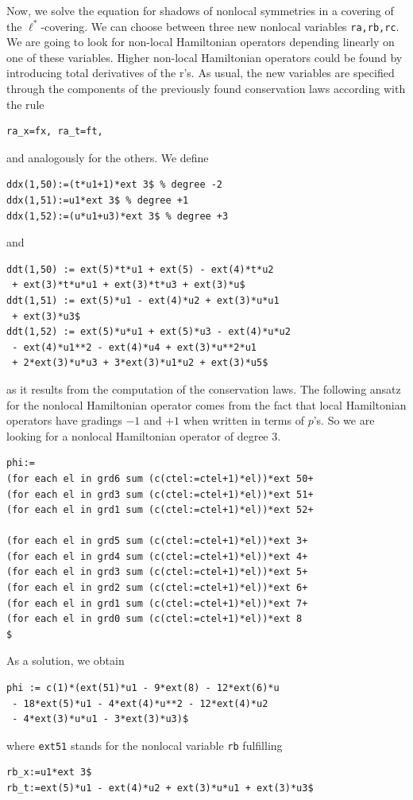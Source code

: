 Now, we solve the equation for shadows of nonlocal symmetries in a covering of
the $\ell^*$-covering. We can choose between three new nonlocal variables
\texttt{ra,rb,rc}. We are going to look for non-local Hamiltonian operators
depending linearly on one of these variables. Higher non-local Hamiltonian
operators could be found by introducing total derivatives of the r's.
As usual, the new variables are specified through the components of the
previously found conservation laws according with the rule
\begin{verbatim}
ra_x=fx, ra_t=ft,
\end{verbatim}
and analogously for the others. We define
\begin{verbatim}
ddx(1,50):=(t*u1+1)*ext 3$ % degree -2
ddx(1,51):=u1*ext 3$ % degree +1
ddx(1,52):=(u*u1+u3)*ext 3$ % degree +3
\end{verbatim}
and
\begin{verbatim}
ddt(1,50) := ext(5)*t*u1 + ext(5) - ext(4)*t*u2
 + ext(3)*t*u*u1 + ext(3)*t*u3 + ext(3)*u$
ddt(1,51) := ext(5)*u1 - ext(4)*u2 + ext(3)*u*u1
 + ext(3)*u3$
ddt(1,52) := ext(5)*u*u1 + ext(5)*u3 - ext(4)*u*u2
 - ext(4)*u1**2 - ext(4)*u4 + ext(3)*u**2*u1
 + 2*ext(3)*u*u3 + 3*ext(3)*u1*u2 + ext(3)*u5$
\end{verbatim}
as it results from the computation of the conservation laws.
The following ansatz for the nonlocal Hamiltonian operator
comes from the fact that local Hamiltonian operators have
gradings $-1$ and $+1$ when written in terms of $p$'s. So we are looking
for a nonlocal Hamiltonian operator of degree $3$.
\begin{verbatim}
phi:=
(for each el in grd6 sum (c(ctel:=ctel+1)*el))*ext 50+
(for each el in grd3 sum (c(ctel:=ctel+1)*el))*ext 51+
(for each el in grd1 sum (c(ctel:=ctel+1)*el))*ext 52+

(for each el in grd5 sum (c(ctel:=ctel+1)*el))*ext 3+
(for each el in grd4 sum (c(ctel:=ctel+1)*el))*ext 4+
(for each el in grd3 sum (c(ctel:=ctel+1)*el))*ext 5+
(for each el in grd2 sum (c(ctel:=ctel+1)*el))*ext 6+
(for each el in grd1 sum (c(ctel:=ctel+1)*el))*ext 7+
(for each el in grd0 sum (c(ctel:=ctel+1)*el))*ext 8
$
\end{verbatim}
As a solution, we obtain
\begin{verbatim}
phi := c(1)*(ext(51)*u1 - 9*ext(8) - 12*ext(6)*u
 - 18*ext(5)*u1 - 4*ext(4)*u**2 - 12*ext(4)*u2
 - 4*ext(3)*u*u1 - 3*ext(3)*u3)$
\end{verbatim}
where \texttt{ext51} stands for the nonlocal variable \texttt{rb} fulfilling
\begin{verbatim}
rb_x:=u1*ext 3$
rb_t:=ext(5)*u1 - ext(4)*u2 + ext(3)*u*u1 + ext(3)*u3$
\end{verbatim}


